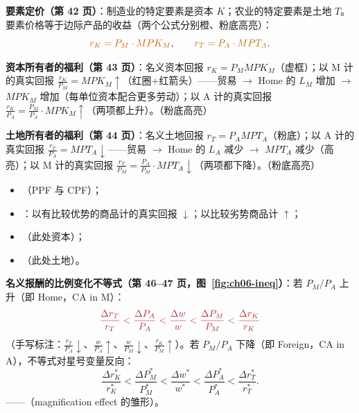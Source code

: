 
\textbf{要素定价（第 42 页）}：制造业的特定要素是资本 $K$；农业的特定要素是土地 $T$。要素价格等于边际产品的收益（两个公式分别橙、粉底高亮）：
\[
{\color{hlorange}r_K = P_M \cdot MPK_M}, \qquad {\color{hlorange}r_T = P_A \cdot MPT_A}.
\]

\textbf{资本所有者的福利（第 43 页）}：名义资本回报 $r_K = P_M MPK_M$（虚框）；以 M 计的真实回报 $\frac{r_K}{P_M} = MPK_M \uparrow$（红圈+红箭头）——贸易 $\to$ Home 的 $L_M$ 增加 $\to$ $MPK_M$ 增加（每单位资本配合更多劳动）；以 A 计的真实回报 $\frac{r_K}{P_A} = \frac{P_M}{P_A} \cdot MPK_M \uparrow$（两项都上升）。（粉底高亮）

\textbf{土地所有者的福利（第 44 页）}：名义土地回报 $r_T = P_A MPT_A$（粉底）；以 A 计的真实回报 $\frac{r_T}{P_A} = MPT_A \downarrow$——贸易 $\to$ Home 的 $L_A$ 减少 $\to$ $MPT_A$ 减少（高亮）；以 M 计的真实回报 $\frac{r_T}{P_M} = \frac{P_A}{P_M} \cdot MPT_A \downarrow$（两项都下降）。（粉底高亮）

\begin{thmbox}
\begin{itemize}
  \item {}（PPF 与 CPF）；
  \item {}：以有比较优势的商品计的真实回报 $\downarrow$；以比较劣势商品计 $\uparrow$；
  \item {}（此处资本）；
  \item {}（此处土地）。
\end{itemize}
\end{thmbox}

\textbf{名义报酬的比例变化不等式（第 46--47 页，图~\ref{fig:ch06-ineq}）}：若 $P_M/P_A$ 上升（即 Home，CA in M）：
\[
{\color{warnred}\frac{\Delta r_T}{r_T} < \frac{\Delta P_A}{P_A} < \frac{\Delta w}{w} < \frac{\Delta P_M}{P_M} < \frac{\Delta r_K}{r_K}}
\]
（手写标注：$\frac{r_T}{P_A} \downarrow$、$\frac{w}{P_A} \uparrow$、$\frac{w}{P_M} \downarrow$、$\frac{r_K}{P_M} \uparrow$）。若 $P_M/P_A$ 下降（即 Foreign，CA in A），不等式对星号变量反向：
\[
\frac{\Delta r_K^*}{r_K^*} < \frac{\Delta P_M^*}{P_M^*} < \frac{\Delta w^*}{w^*} < \frac{\Delta P_A^*}{P_A^*} < \frac{\Delta r_T^*}{r_T^*}.
\]
——（magnification effect 的雏形）。

